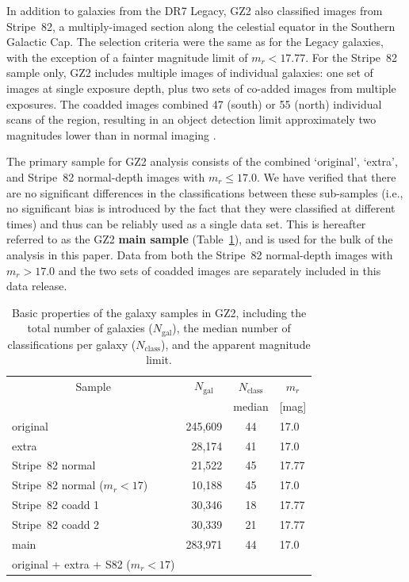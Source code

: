 \documentclass[useAMS,usenatbib]{mn2e}
\begin{document}
In addition to galaxies from the DR7 Legacy, GZ2 also classified images from Stripe~82, a multiply-imaged section along the celestial equator in the Southern Galactic Cap. The selection criteria were the same as for the Legacy galaxies, with the exception of a fainter magnitude limit of $m_r < 17.77$. For the Stripe~82 sample only, GZ2 includes multiple images of individual galaxies: one set of images at single exposure depth, plus two sets of co-added images from multiple exposures. The coadded images combined 47 (south) or 55 (north) individual scans of the region, resulting in an object detection limit approximately two magnitudes lower than in normal imaging \citep{ann11}. 

The primary sample for GZ2 analysis consists of the combined `original', `extra', and Stripe~82 normal-depth images with $m_r\leq17.0$. We have verified that there are no significant differences in the classifications between these sub-samples (i.e., no significant bias is introduced by the fact that they were classified at different times) and thus can be reliably used as a single data set. This is hereafter referred to as the GZ2 {\bf main sample} (Table~\ref{tbl-sample}), and is used for the bulk of the analysis in this paper. Data from both the Stripe~82 normal-depth images with $m_r>17.0$ and the two sets of coadded images are separately included in this data release. 

\begin{table}
 \begin{tabular}{@{}lrcl}
 \hline
\multicolumn{1}{c}{Sample} &
\multicolumn{1}{c}{$N_\mathrm{gal}$} &
\multicolumn{1}{c}{$N_\mathrm{class}$} &
\multicolumn{1}{c}{$m_r$} 
\\ 
\multicolumn{1}{c}{} &
\multicolumn{1}{c}{} &
\multicolumn{1}{c}{median} &
\multicolumn{1}{c}{[mag]} 
\\ 
\hline
\hline						
original                       & 245,609 & 44  & 17.0   \\     %
extra                          &  28,174 & 41  & 17.0   \\     %
Stripe~82 normal               &  21,522 & 45  & 17.77  \\     %
Stripe~82 normal ($m_r<17$)    &  10,188 & 45  & 17.0   \\     %
Stripe~82 coadd 1              &  30,346 & 18  & 17.77  \\     %
Stripe~82 coadd 2              &  30,339 & 21  & 17.77  \\     %
\hline
main                           & 283,971 & 44  & 17.0   \\     %
original + extra + S82 ($m_r<17$) & \\
\hline
 \end{tabular}
 \caption{Basic properties of the galaxy samples in GZ2, including the total number of galaxies ($N_\mathrm{gal}$), the median number of classifications per galaxy ($N_\mathrm{class}$), and the apparent magnitude limit. \label{tbl-sample}}
\end{table}
\end{document}
